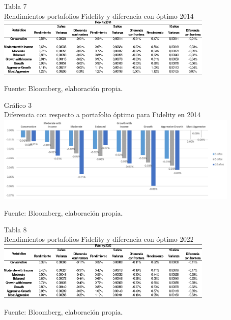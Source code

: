 \documentclass[a4paper,fleqn]{cas-sc}
\begin{document}
\begin{center}
	Tabla 7\\
	Rendimientos portafolios Fidelity y diferencia con óptimo 2014\\

	\includegraphics[width=0.8\textwidth]{image/tabla7.png}

	\tiny Fuente: Bloomberg, elaboración propia.
\end{center}
\newpage
\begin{center}
	Gráfico 3\\
	Diferencia con respecto a portafolio óptimo para Fidelity en 2014\\

	\includegraphics[width=0.9\textwidth]{image/imagen3.png}

	\tiny Fuente: Bloomberg, elaboración propia.
\end{center}

\begin{center}
	Tabla 8\\
	Rendimientos portafolios Fidelity y diferencia con óptimo 2022\\

	\includegraphics[width=0.8\textwidth]{image/tabla8.png}

	\tiny Fuente: Bloomberg, elaboración propia.
\end{center}
\end{document}
